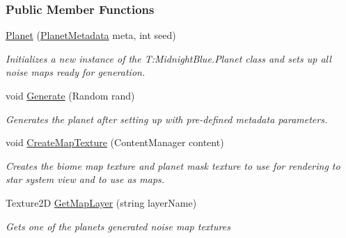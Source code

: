 \subsubsection*{Public Member Functions}
\begin{DoxyCompactItemize}
\item 
\hyperlink{class_midnight_blue_1_1_planet_a649f87901a50e64a6423438504e468a4}{Planet} (\hyperlink{class_midnight_blue_1_1_planet_metadata}{Planet\+Metadata} meta, int seed)
\begin{DoxyCompactList}\small\item\em Initializes a new instance of the T\+:\+Midnight\+Blue.\+Planet class and sets up all noise maps ready for generation. \end{DoxyCompactList}\item 
void \hyperlink{class_midnight_blue_1_1_planet_ac7264aea3a992afb4cab0ad99c96dbb8}{Generate} (Random rand)
\begin{DoxyCompactList}\small\item\em Generates the planet after setting up with pre-\/defined metadata parameters. \end{DoxyCompactList}\item 
void \hyperlink{class_midnight_blue_1_1_planet_ae39b013905369f01902b4f28d4fc031e}{Create\+Map\+Texture} (Content\+Manager content)
\begin{DoxyCompactList}\small\item\em Creates the biome map texture and planet mask texture to use for rendering to star system view and to use as maps. \end{DoxyCompactList}\item 
Texture2D \hyperlink{class_midnight_blue_1_1_planet_ac3b3442ad8f168a8d9151386592eb270}{Get\+Map\+Layer} (string layer\+Name)
\begin{DoxyCompactList}\small\item\em Gets one of the planets generated noise map textures \end{DoxyCompactList}\end{DoxyCompactItemize}
